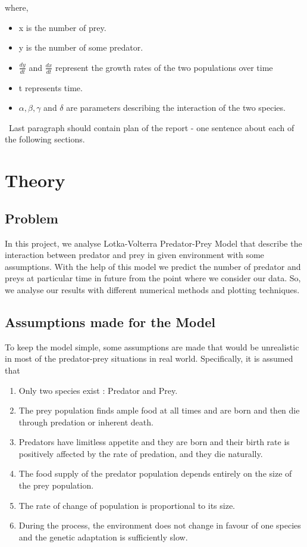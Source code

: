 \documentclass[12pt]{article}
\begin{document}
where,
\begin{itemize}
    \item x is the number of prey.
    \item y is the number of some predator.
    \item $ \frac { d y } { d t } $ and $ \frac { d x } { d t } $ represent the growth rates of the two populations over time
    \item t represents time.
    \item $ \alpha , \beta , \gamma $ and $ \delta $ are parameters describing the interaction of the two species.
\end{itemize}
\
\newline Last paragraph should contain plan of the report - one sentence about each of the following sections.
\newpage

\section{Theory}
\label{sec:theory}
\subsection*{Problem}
In this project, we analyse Lotka-Volterra Predator-Prey Model that describe the interaction between predator and prey in given environment with some assumptions. With the help of this model we predict the number of predator and preys at particular time in future from the point where we consider our data. So, we analyse our results with different numerical methods and plotting techniques.
\subsection*{Assumptions made for the Model}
To keep the model simple,  some assumptions are made that would be unrealistic in most of the predator-prey situations in real world. Specifically, it is assumed that
\begin{enumerate}
    \item Only two species exist : Predator and Prey.
    \item The prey population finds ample food at all times and are born and then die through predation or inherent death.
    \item Predators have limitless appetite and they are born and their birth rate is positively affected by the rate of predation, and they die naturally.
    \item The food supply of the predator population depends entirely on the size of the prey population.
    \item The rate of change of population is proportional to its size.
    \item During the process, the environment does not change in favour of one species and the genetic adaptation is sufficiently slow.
\end{enumerate}
\end{document}
